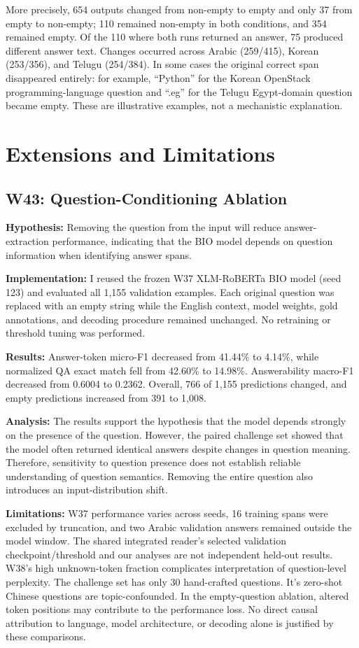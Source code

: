 \documentclass[11pt,a4paper,twocolumn]{article}
\begin{document}
More precisely, 654 outputs changed from non-empty to empty and only 37 from empty to non-empty; 110 remained non-empty in both conditions, and 354 remained empty. Of the 110 where both runs returned an answer, 75 produced different answer text. Changes occurred across Arabic (259/415), Korean (253/356), and Telugu (254/384). In some cases the original correct span disappeared entirely: for example, ``Python'' for the Korean OpenStack programming-language question and ``.eg'' for the Telugu Egypt-domain question became empty. These are illustrative examples, not a mechanistic explanation.


\section{Extensions and Limitations}

\subsection{W43: Question-Conditioning Ablation}

\textbf{Hypothesis:}
Removing the question from the input will reduce
answer-extraction performance, indicating that
the BIO model depends on question information
when identifying answer spans.

\textbf{Implementation:}
I reused the frozen W37 XLM-RoBERTa BIO model
(seed 123) and evaluated all 1,155 validation
examples. Each original question was replaced
with an empty string while the English context,
model weights, gold annotations, and decoding
procedure remained unchanged. No retraining or
threshold tuning was performed.

\textbf{Results:}
Answer-token micro-F1 decreased from 41.44\%
to 4.14\%, while normalized QA exact match
fell from 42.60\% to 14.98\%. Answerability
macro-F1 decreased from 0.6004 to 0.2362.
Overall, 766 of 1,155 predictions changed,
and empty predictions increased from 391
to 1,008.

\textbf{Analysis:}
The results support the hypothesis that the
model depends strongly on the presence of the
question. However, the paired challenge set
showed that the model often returned identical
answers despite changes in question meaning.
Therefore, sensitivity to question presence
does not establish reliable understanding of
question semantics. Removing the entire question
also introduces an input-distribution shift.


\textbf{Limitations:} W37 performance varies across seeds, 16 training spans were excluded by truncation, and two Arabic validation answers remained outside the model window. The shared integrated reader's selected validation checkpoint/threshold and our analyses are not independent held-out results. W38's high unknown-token fraction complicates interpretation of question-level perplexity. The challenge set has only 30 hand-crafted questions. It's zero-shot Chinese questions are topic-confounded. In the empty-question ablation, altered token positions may contribute to the performance loss. No direct causal attribution to language, model architecture, or decoding alone is justified by these comparisons.
\end{document}
